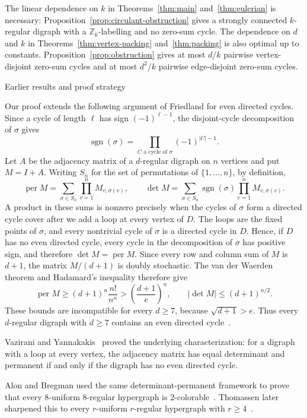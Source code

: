 \documentclass[11pt]{amsart}
\makeatletter
\def\subsection{\@startsection{subsection}{2}%
  \z@{1.05\linespacing\@plus.5\linespacing}{.4\linespacing}%
  {\normalfont\large\bfseries\raggedright}}
\theoremstyle{remark}
\newcommand{\per}{\operatorname{per}}
\makeatother
\begin{document}
The linear dependence on $k$ in Theorems~\ref{thm:main}
and~\ref{thm:eulerian} is necessary: Proposition~\ref{prop:circulant-obstruction}
gives a strongly connected $k$-regular digraph with a
$\mathbb Z_k$-labelling and no zero-sum cycle.  The dependence on $d$
and $k$ in Theorems~\ref{thm:vertex-packing} and~\ref{thm:packing} is
also optimal up to constants.
Proposition~\ref{prop:obstruction} gives at most $d/k$ pairwise
vertex-disjoint zero-sum cycles and at most $d^2/k$ pairwise
edge-disjoint zero-sum cycles.

\subsection{Earlier results and proof strategy}

Our proof extends the following argument of Friedland for even directed
cycles.  Since a cycle of length $\ell$ has sign $(-1)^{\ell-1}$, the
disjoint-cycle decomposition of $\sigma$ gives
\[
  \operatorname{sgn}(\sigma)
  =\prod_{C\text{ a cycle of }\sigma}(-1)^{|C|-1}.
\]
Let $A$ be the adjacency matrix of a $d$-regular digraph on
$n$ vertices and put $M=I+A$.  Writing $S_n$ for the set of
permutations of $\{1,\ldots,n\}$, by definition,
\[
  \per M=\sum_{\sigma\in S_n}\prod_{v=1}^n M_{v,\sigma(v)},
  \qquad
  \det M=\sum_{\sigma\in S_n}\operatorname{sgn}(\sigma)
             \prod_{v=1}^n M_{v,\sigma(v)}.
\]
A product in these sums is nonzero precisely when the cycles of
$\sigma$ form a directed cycle cover after we add a loop at every
vertex of $D$.  The loops are the fixed points of
$\sigma$, and every nontrivial cycle of $\sigma$ is a directed cycle in
$D$.  Hence, if $D$ has no even directed cycle, every cycle in the
decomposition of $\sigma$ has positive sign, and therefore
$\det M=\per M$.  Since every row and column sum of $M$ is $d+1$, the
matrix $M/(d+1)$ is doubly stochastic.
The van der Waerden theorem and Hadamard's inequality therefore give
\[
  \per M\ge(d+1)^n\frac{n!}{n^n}
  >\left(\frac{d+1}{e}\right)^n,
  \qquad
  |\det M|\le(d+1)^{n/2}.
\]
These bounds are incompatible for every $d\ge7$, because
$\sqrt{d+1}>e$.  Thus every $d$-regular digraph with $d\ge7$ contains
an even directed cycle~\cite{Friedland}.

Vazirani and Yannakakis~\cite{VaziraniYannakakis} proved the underlying
characterization: for a digraph with a loop at every vertex, the
adjacency matrix has equal determinant and permanent if and only if the
digraph has no even directed cycle.

Alon and Bregman used the same determinant-permanent framework to prove
that every $8$-uniform $8$-regular hypergraph is
$2$-colorable~\cite{AlonBregman}.  Thomassen later sharpened this to
every $r$-uniform
$r$-regular hypergraph with $r\ge4$~\cite{Thomassen1992}.
\end{document}
